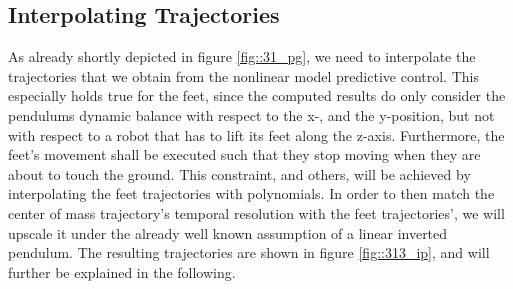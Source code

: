 \subsection{Interpolating Trajectories}
\label{sec::313_it}
As already shortly depicted in figure \ref{fig::31_pg}, we need to interpolate the trajectories that we obtain from the nonlinear model predictive control. This especially holds true for the feet, since the computed results do only consider the pendulums dynamic balance with respect to the x-, and the y-position, but not with respect to a robot that has to lift its feet along the z-axis. Furthermore, the feet's movement shall be executed such that they stop moving when they are about to touch the ground. This constraint, and others, will be achieved by interpolating the feet trajectories with polynomials. In order to then match the center of mass trajectory's temporal resolution with the feet trajectories', we will upscale it under the already well known assumption of a linear inverted pendulum. The resulting trajectories are shown in figure \ref{fig::313_ip}, and will further be explained in the following. 
